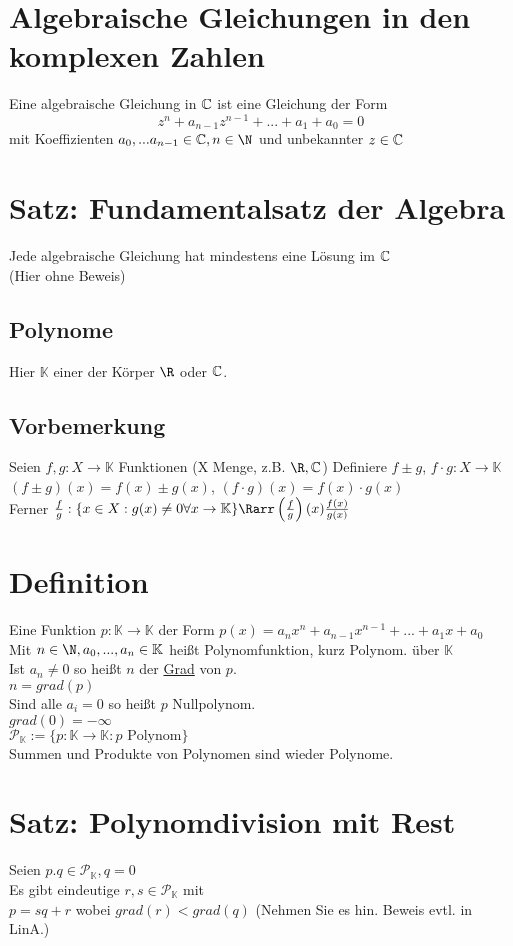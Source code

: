 \section*{Algebraische Gleichungen in den komplexen Zahlen}
Eine algebraische Gleichung in $\text{$\mathbb{C}$}$ ist eine Gleichung der Form 
$$z^n + a_{n-1}z^{n-1} + ... + a_1 + a_0 = 0$$
mit Koeffizienten $a_0, ... a_{n-1} \in \C, n\in \N$ und unbekannter $z\in \text{$\mathbb{C}$}$
\section{Satz: Fundamentalsatz der Algebra}
Jede algebraische Gleichung hat mindestens eine Lösung im $\text{$\mathbb{C}$}$\\
(Hier ohne Beweis)
\subsection*{Polynome}
Hier $\mathbb{K}$ einer der Körper $\R$ oder $\text{$\mathbb{C}$}$.
\subsection*{Vorbemerkung}
Seien $f, g: X \to \mathbb{K}$ Funktionen (X Menge, z.B. $\R, \C$)
Definiere $f±g$, $f\cdot g: X \to \mathbb{K}$\\
$(f±g)(x) = f(x) ± g(x)$, $(f\cdot g)(x)= f(x) \cdot g(x)$\\
Ferner $\frac{f}{g}:\{x\in X: g(x) \neq 0 \forall x \to \mathbb{K}\} \Rarr\left(\frac{f}{g}\right)(x) \frac{f(x)}{g(x)}$
\section{Definition}
Eine Funktion $p:\mathbb{K} \to \mathbb{K}$ der Form $p(x) = a_nx^n + a_{n-1}x^{n-1} + ... + a_1x + a_0$\\
Mit $n\in \N, a_0, ..., a_n \in \mathbb{K}$ heißt Polynomfunktion, kurz Polynom. über $\mathbb{K}$\\
Ist $a_n \neq 0$ so heißt $n$ der \ul{Grad} von $p$.\\
$n = grad(p)$\\
Sind alle $a_i = 0$ so heißt $p$ Nullpolynom.\\
$grad(0) = -∞$\\
$\mathcal{P}_{\mathbb{K}} := \{p:\mathbb{K} \to \mathbb{K}: p \text{ Polynom}\}$\\
Summen und Produkte von Polynomen sind wieder Polynome.\\
\section{Satz: Polynomdivision mit Rest}
Seien $p. q \in \mathcal{P}_{\mathbb{K}}, q = 0$\\
Es gibt eindeutige $r, s \in \mathcal{P}_{\mathbb{K}}$ mit\\
$p = sq + r$ wobei $grad(r) < grad(q)$
(Nehmen Sie es hin. Beweis evtl. in LinA.)
